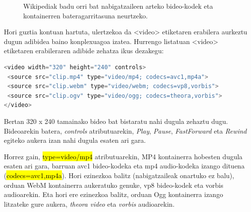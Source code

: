\begin{figure}[ht]
	\centering
{}
\caption{Wikipediak badu orri bat nabigatzaileen arteko bideo-kodek eta kontainerren bateragarritasuna neurtzeko.}
\label{fig:bideokodekwikipedia}
\end{figure}


Hori guztia kontuan hartuta, ulertzekoa da <video> etiketaren erabilera aurkeztu dugun adibidea baino konplexuagoa izatea. Hurrengo listatuan <video> etiketaren erabileraren adibide zehatza ikus dezakegu:

\begin{lstlisting}[language=JavaScript,label={lst:bideoadibidea}]
<video width="320" height="240" controls>
 <source src="clip.mp4" type="video/mp4; codecs=avc1,mp4a">
 <source src="clip.webm" type="video/webm; codecs=vp8,vorbis">
 <source src="clip.ogv" type="video/ogg; codecs=theora,vorbis">
</video>
\end{lstlisting}

Bertan 320 x 240 tamainako bideo bat bistaratu nahi dugula zehaztu dugu. Bideoarekin batera, \textit{controls} atributuarekin, \textit{Play}, \textit{Pause}, \textit{FastForward} eta \textit{Rewind} egiteko aukera izan nahi dugula esaten ari gara.

Horrez gain, \hl{type=video/mp4} atributuarekin, MP4 kontainerra hobesten dugula esaten ari gara, barruan avc1 bideo-kodeka eta mp4 audio-kodeka izango dituena (\hl{codecs=avc1,mp4a}). Hori ezinezkoa balitz (nabigatzaileak onartuko ez balu), orduan WebM kontainerra aukeratuko genuke, vp8  bideo-kodek eta vorbis audioarekin. Eta hori ere ezinezkoa balitz, orduan Ogg  kontainerra izango litzateke gure aukera, \textit{theora video} eta \textit{vorbis} audioarekin.

